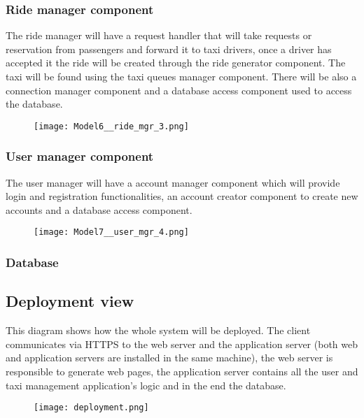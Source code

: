 	\subsubsection{Ride manager component}
		The ride manager will have a request handler that will take requests or reservation from passengers and forward it to taxi drivers, once a driver has accepted it the ride will be created through the ride generator component. The taxi will be found using the taxi queues manager component. There will be also a connection manager component and a database access component used to access the database.
		\begin{figure}[h!]
			\centering
			\texttt{[image: Model6\_\_ride\_mgr\_3.png]}
		\end{figure}
		\newpage

	\subsubsection{User manager component}
		The user manager will have a account manager component which will provide login and registration functionalities, an account creator component to create new accounts and a database access component.
		\begin{figure}[h!]
			\centering
			\texttt{[image: Model7\_\_user\_mgr\_4.png]}
		\end{figure}
		\newpage
	
	\subsubsection{Database}
	\begin{figure}[h!]
		\centering
	\end{figure}
	\newpage		

\subsection{Deployment view}
This diagram shows how the whole system will be deployed.
The client communicates via HTTPS to the web server and the application server (both web and application servers are installed in the same machine), the web server is responsible to generate web pages, the application server contains all the user and taxi management application's logic and in the end the database.
	\begin{figure}[h!]
		\centering
		\texttt{[image: deployment.png]}
	\end{figure}
	\newpage

